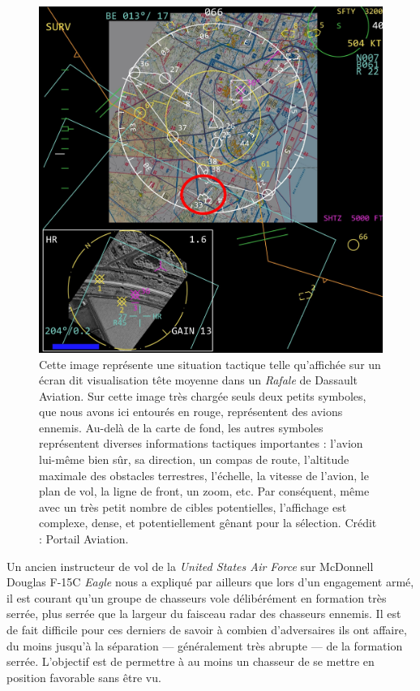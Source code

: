 	\begin{figure}[!htbp]
		\centering
		\includegraphics[width=\textwidth]{figures/ch1/sitac}
		\caption[Situation tactique vue d'un \emph{Rafale}]{Cette image représente une situation tactique telle qu'affichée sur un écran dit \og visualisation tête moyenne \fg{} dans un \emph{Rafale} de Dassault Aviation. Sur cette image très \og chargée \fg{} seuls deux petits symboles, que nous avons ici entourés en rouge, représentent des avions ennemis. Au-delà de la carte de fond, les autres symboles représentent diverses informations tactiques importantes : l'avion lui-même bien sûr, sa direction, un compas de route, l'altitude maximale des obstacles terrestres, l'échelle, la vitesse de l'avion, le plan de vol, la ligne de front, un zoom, etc. Par conséquent, même avec un très petit nombre de cibles potentielles, l'affichage est complexe, dense, et potentiellement gênant pour la sélection. Crédit : Portail Aviation\footnotemark.}
		\label{fig:sitac}
	\end{figure}
	
	
	Un ancien instructeur de vol de la \emph{United States Air Force}\footnotemark{} sur McDonnell Douglas F-15C \emph{Eagle} nous a expliqué par ailleurs que lors d'un engagement armé, il est courant qu'un groupe de chasseurs vole délibérément en formation très serrée, plus serrée que la largeur du faisceau radar des chasseurs ennemis. Il est de fait difficile pour ces derniers de savoir à combien d'adversaires ils ont affaire, du moins jusqu'à la séparation --- généralement très abrupte --- de la formation serrée. L'objectif est de permettre à au moins un chasseur de se mettre en position favorable sans être vu.
	
